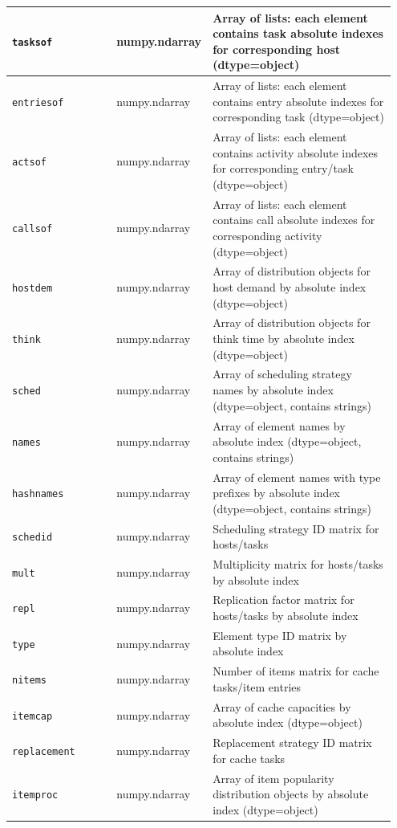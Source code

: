 \begin{PYTHON}
{\begin{longtable}{|p{0.28\linewidth}|p{0.17\linewidth}|p{0.50\linewidth}|}
\texttt{tasksof} & numpy.ndarray & Array of lists: each element contains task absolute indexes for corresponding host (dtype=object)\\\hline
\texttt{entriesof} & numpy.ndarray & Array of lists: each element contains entry absolute indexes for corresponding task (dtype=object)\\\hline
\texttt{actsof} & numpy.ndarray & Array of lists: each element contains activity absolute indexes for corresponding entry/task (dtype=object)\\\hline
\texttt{callsof} & numpy.ndarray & Array of lists: each element contains call absolute indexes for corresponding activity (dtype=object)\\\hline
\texttt{hostdem} & numpy.ndarray & Array of distribution objects for host demand by absolute index (dtype=object)\\\hline
\texttt{think} & numpy.ndarray & Array of distribution objects for think time by absolute index (dtype=object)\\\hline
\texttt{sched} & numpy.ndarray & Array of scheduling strategy names by absolute index (dtype=object, contains strings)\\\hline
\texttt{names} & numpy.ndarray & Array of element names by absolute index (dtype=object, contains strings)\\\hline
\texttt{hashnames} & numpy.ndarray & Array of element names with type prefixes by absolute index (dtype=object, contains strings)\\\hline
\texttt{schedid} & numpy.ndarray & Scheduling strategy ID matrix for hosts/tasks\\\hline
\texttt{mult} & numpy.ndarray & Multiplicity matrix for hosts/tasks by absolute index\\\hline
\texttt{repl} & numpy.ndarray & Replication factor matrix for hosts/tasks by absolute index\\\hline
\texttt{type} & numpy.ndarray & Element type ID matrix by absolute index\\\hline
\texttt{nitems} & numpy.ndarray & Number of items matrix for cache tasks/item entries\\\hline
\texttt{itemcap} & numpy.ndarray & Array of cache capacities by absolute index (dtype=object)\\\hline
\texttt{replacement} & numpy.ndarray & Replacement strategy ID matrix for cache tasks\\\hline
\texttt{itemproc} & numpy.ndarray & Array of item popularity distribution objects by absolute index (dtype=object)\\\hline

\end{longtable}}
\end{PYTHON}

